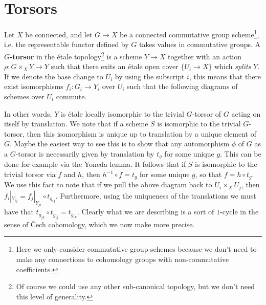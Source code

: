 \documentclass{ucbthesis}
\theoremstyle{definition}
\theoremstyle{theorem}
\begin{document}
\section{Torsors}
Let $X$ be connected, and let $G\rightarrow X$ be a connected commutative group scheme\footnote{Here we only consider commutative group schemes because we don't need to make any connections to cohomology groups with non-commutative coefficients.}, i.e. the representable functor defined by $G$ takes values in commutative groups. A $G$\textbf{-torsor} in the \'{e}tale topology\footnote{Of course we could use any other sub-canonical topology, but we don't need this level of generality.} is a scheme $Y\rightarrow X$ together with an action $\rho:G\times_{X}Y \rightarrow Y$ such that there exits an \'{e}tale open cover $\{U_{i} \rightarrow X\}$ which \emph{splits} $Y$. If we denote the base change to $U_{i}$ by using the subscript $i$, this means that there exist isomorphisms $f_{i}:G_{i} \rightarrow Y_{i}$ over $U_{i}$ such that the following diagrams of schemes over $U_{i}$ commute. 

\begin{center}
\end{center}

In other words, $Y$ is \'{e}tale locally isomorphic to the trivial $G$-torsor of $G$ acting on itself by  translation. We note that if a scheme $S$ is isomorphic to the trivial $G$-torsor, then this isomorphism is unique up to translation by a unique element of $G$. Maybe the easiest way to see this is to show that any automorphism $\phi$ of $G$ as a $G$-torsor is necessarily given by translation by $t_g$ for some unique $g$. This can be done for example via the Yoneda lemma. It follows that if $S$ is isomorphic to the trivial torsor via $f$ and $h$, then $h^{-1}\circ f = t_{g}$ for some unique $g$, so that $f=h\circ t_{g}$. We use this fact to note that if we pull the above diagram back to $U_{i}\times_{X} U_{j}$, then $f_{i}|_{Y_{ij}} = f_{j}|_{Y_{ji}}\circ t_{g_{ij}}$. Furthermore, using the uniqueness of the translations we must have that $t_{g_{jk}}\circ t_{g_{ij}} = t_{g_{ik}}$. Clearly what we are describing is a sort of $1$-cycle in the sense of \v{C}ech cohomology, which we now make more precise. 
\end{document}
